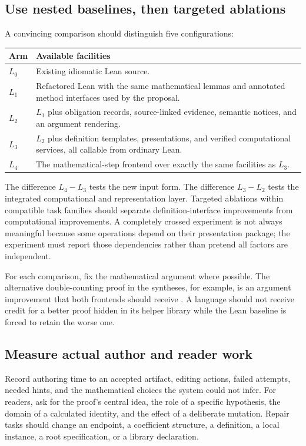 \documentclass[11pt,letterpaper]{article}
\numberwithin{equation}{section}
\begin{document}
\subsection{Use nested baselines, then targeted ablations}
A convincing comparison should distinguish five configurations:

\begin{tabularx}{\textwidth}{@{}P{.12\textwidth}Y@{}}
\toprule
Arm & Available facilities\\
\midrule
$L_0$ & Existing idiomatic Lean source.\\
$L_1$ & Refactored Lean with the same mathematical lemmas and annotated method
interfaces used by the proposal.\\
$L_2$ & $L_1$ plus obligation records, source-linked evidence, semantic notices,
and an argument rendering.\\
$L_3$ & $L_2$ plus definition templates, presentations, and verified computational
services, all callable from ordinary Lean.\\
$L_4$ & The mathematical-step frontend over exactly the same facilities as $L_3$.\\
\bottomrule
\end{tabularx}


The difference $L_4-L_3$ tests the new input form. The difference $L_3-L_2$
tests the integrated computational and representation layer. Targeted ablations
within compatible task families should separate definition-interface improvements
from computational improvements. A completely crossed experiment is not always
meaningful because some operations depend on their presentation package; the
experiment must report those dependencies rather than pretend all factors are
independent.

For each comparison, fix the mathematical argument where possible. The
alternative double-counting proof in the syntheses, for example, is an argument
improvement that both frontends should receive \cite{synthesis,blueprints}.
A language should not receive credit for a better proof hidden in its helper
library while the Lean baseline is forced to retain the worse one.

\subsection{Measure actual author and reader work}
Record authoring time to an accepted artifact, editing actions, failed attempts,
needed hints, and the mathematical choices the system could not infer. For
readers, ask for the proof's central idea, the role of a specific hypothesis,
the domain of a calculated identity, and the effect of a deliberate mutation.
Repair tasks should change an endpoint, a coefficient structure, a definition,
a local instance, a root specification, or a library declaration.
\end{document}
